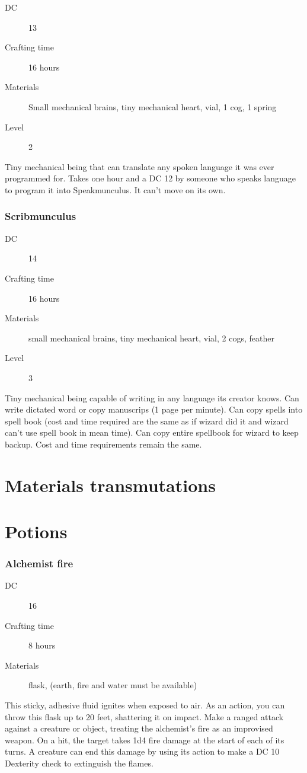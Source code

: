 \begin{description}
\item [DC] 13 \arcana
\item [Crafting time] 16 hours
\item [Materials] Small mechanical brains, tiny mechanical heart, vial, 1 cog, 1 spring
\item [Level] 2
\end{description}

Tiny mechanical being that can translate any spoken language it was ever programmed for. Takes one hour and a DC 12 \intelligence by someone who speaks language to program it into Speakmunculus. It can't move on its own.

\subsubsection{Scribmunculus}

\begin{description}
\item [DC] 14 \arcana
\item [Crafting time] 16 hours
\item [Materials] small mechanical brains, tiny mechanical heart, vial, 2 cogs, feather
\item [Level] 3
\end{description}

Tiny mechanical being capable of writing in any language its creator knows. Can write dictated word or copy manuscrips (1 page per minute). Can copy spells into spell book (cost and time required are the same as if wizard did it and wizard can't use spell book in mean time). Can copy entire spellbook for wizard to keep backup. Cost and time requirements remain the same. 

\section{Materials transmutations}

\section{Potions}

\subsubsection{Alchemist fire}

\begin{description}
\item [DC] 16 \arcana
\item [Crafting time] 8 hours
\item [Materials] flask, (earth, fire and water must be available)
\end{description}

This sticky, adhesive fluid ignites when exposed to air. As an action, you can throw this flask up to 20 feet, shattering it on impact. Make a ranged attack against a creature or object, treating the alchemist's fire as an improvised weapon. On a hit, the target takes 1d4 fire damage at the start of each of its turns. A creature can end this damage by using its action to make a DC 10 Dexterity check to extinguish the flames.